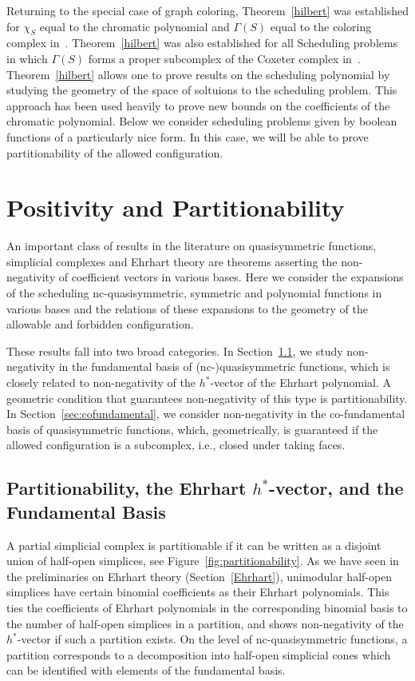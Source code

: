 \documentclass[12pt,reqno]{amsart}
\numberwithin{definition}{section}
\theoremstyle{definition}
\newcommand{\forb}{\Gamma} %
\begin{document}
Returning to the special case of graph coloring, Theorem~\ref{hilbert}
was established for $\chi_S$ equal to the chromatic polynomial and
$\forb(S)$ equal to the coloring complex in~\cite{Ein}.
Theorem~\ref{hilbert} was also established for all Scheduling problems
in which $\forb(S)$ forms a proper subcomplex of the Coxeter complex
in~\cite{ABK}.  Theorem~\ref{hilbert} allows one to prove results on
the scheduling polynomial by studying the geometry of the space of
soltuions to the scheduling problem.  This approach has been used
heavily to prove new bounds on the coefficients of the chromatic
polynomial.   Below we consider scheduling problems given by boolean functions
of a particularly nice form.  In this case, we will be able to prove partitionability of the allowed configuration.



\section{Positivity and Partitionability}
\label{geometry}

An important class of results in the literature on quasisymmetric
functions, simplicial complexes and Ehrhart theory are theorems
asserting the non-negativity of coefficient vectors in various bases.
Here we consider the expansions of the scheduling nc-quasisymmetric,
symmetric and polynomial functions in various bases and the relations
of these expansions to the geometry of the allowable and forbidden configuration.  

These results fall into two broad categories. In Section~\ref{sec:partitionability}, we study non-negativity in the fundamental basis of (nc-)quasisymmetric functions, which is closely related to non-negativity of the $h^*$-vector of the Ehrhart polynomial. A geometric condition that guarantees non-negativity of this type is partitionability. In Section~\ref{sec:cofundamental}, we consider non-negativity in the co-fundamental basis of quasisymmetric functions, which, geometrically, is guaranteed if the allowed configuration is a subcomplex, i.e., closed under taking faces.

\subsection{Partitionability, the Ehrhart $h^*$-vector, and the Fundamental Basis}
\label{sec:partitionability}

A partial simplicial complex is partitionable if it can be written as a disjoint union of half-open simplices, see Figure~\ref{fig:partitionability}. As we have seen in the preliminaries on Ehrhart theory (Section~\ref{Ehrhart}), unimodular half-open simplices have certain binomial coefficients as their Ehrhart polynomials. This ties the coefficients of Ehrhart polynomials in the corresponding binomial basis to the number of half-open simplices in a partition, and shows non-negativity of the $h^*$-vector if such a partition exists. On the level of nc-quasisymmetric functions, a partition corresponds to a decomposition into half-open simplicial cones which can be identified with elements of the fundamental basis.
\end{document}
